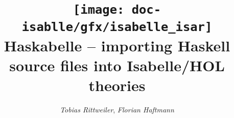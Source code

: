 \documentclass[12pt,a4paper,fleqn]{report}
\title{\texttt{[image: doc-isablle/gfx/isabelle\_isar]}
  \\[4ex] Haskabelle -- importing Haskell source files into Isabelle/HOL theories}
\author{\emph{Tobias Rittweiler}, \emph{Florian Haftmann}}
\begin{document}
\maketitle

\begin{abstract}
  
\end{abstract}

\thispagestyle{empty}\clearpage

\clearfirst



\begingroup
 \small\raggedright\frenchspacing

\endgroup
\end{document}
